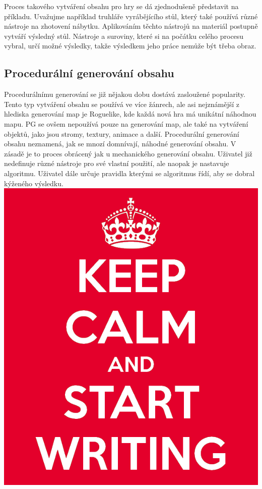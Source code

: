 Proces takového vytváření obsahu pro hry se dá zjednodušeně představit na příkladu. Uvažujme například truhláře vyrábějícího stůl, který také používá různé nástroje na zhotovení nábytku. Aplikováním těchto nástrojů na materiál postupně vytváří výsledný stůl. Nástroje a suroviny, které si na počátku celého procesu vybral, určí možné výsledky, takže výsledkem jeho práce nemůže být třeba obraz.

\subsection{Procedurální generování obsahu}
\label{procedural}
Procedurálnímu generování se již nějakou dobu dostává zasloužené popularity. Tento typ vytváření obsahu se používá ve více žánrech, ale asi nejznámější z hlediska generování map je Roguelike, kde každá nová hra má unikátní náhodnou mapu. PG se ovšem nepoužívá pouze na generování map, ale také na vytváření objektů, jako jsou stromy, textury, animace a další. Procedurální generování obsahu neznamená, jak se mnozí domnívají, náhodné generování obsahu. V zásadě je to proces obrácený jak u mechanického generování obsahu. Uživatel již nedefinuje různé nástroje pro své vlastní použití, ale naopak je nastavuje algoritmu. Uživatel dále určuje pravidla kterými se algoritmus řídí, aby se dobral kýženého výsledku.
\includegraphics[scale=0.3]{obrazky-figures/keep-calm.png}

